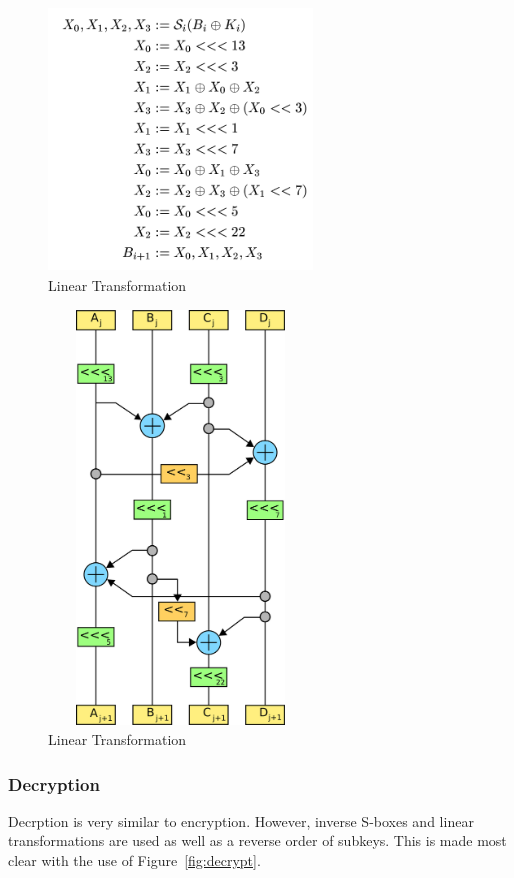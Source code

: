 \documentclass[12pt]{article} %
\begin{document}
\begin{figure}[H]
\centering
\includegraphics[width=7cm,height=7cm]{linear}
\caption{Linear Transformation}
\label{fig:linear}
\end{figure}

\begin{figure}[H]
\centering
\includegraphics[width=7cm,height=11cm]{linear2}
\caption{Linear Transformation}
\label{fig:linear2}
\end{figure}


\subsubsection{Decryption}
Decrption is very similar to encryption. However, inverse S-boxes and linear transformations are used as well as a reverse order of subkeys. This is made most clear with the use of Figure~\ref{fig:decrypt}.
\end{document}
